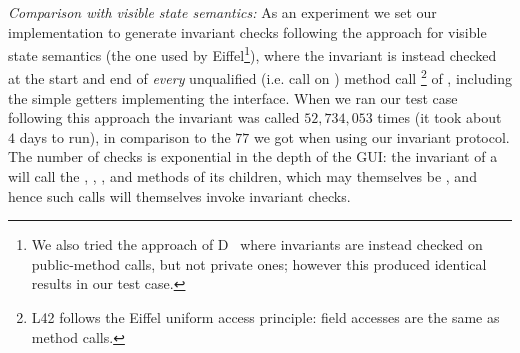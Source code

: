 \textit{Comparison with visible state semantics:}
As an experiment we set our implementation to generate invariant checks following the approach for visible state semantics (the one used by Eiffel\footnote{We also tried the approach of D~\cite{?} where invariants are instead checked on public-method calls, but not private ones; however this produced identical results in our test case.}), where the invariant is instead checked at the start and end of \emph{every} unqualified (i.e. call on \Q@this@) method call%
\footnote{L42 follows the Eiffel uniform access principle: field accesses are the same as method calls.}
of \Q@SafeMovable@, including the simple getters implementing the \Q@Widget@ interface. When we ran our test case following this approach the invariant was called $52,734,053$ times (it took about $4$ days to run), in comparison to the $77$ we got when using our invariant protocol. The number of checks is exponential in the depth of the GUI: the invariant of a \Q@SafeMovable@ will call the \Q@width@, \Q@height@, \Q@left@, and \Q@top@ methods of its children, which may themselves be \Q@SafeMovable@s, and hence such calls will themselves invoke invariant checks. %



